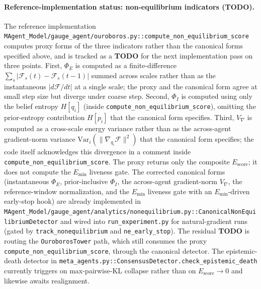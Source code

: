 \documentclass[11pt]{article}
\begin{document}
\paragraph{Reference-implementation status: non-equilibrium indicators (\textbf{TODO}).}
The reference implementation \texttt{MAgent\_Model/gauge\_agent/ouroboros.py::compute\_non\_equilibrium\_score} computes proxy forms of the three indicators rather than the canonical forms specified above, and is tracked as a \textbf{TODO} for the next implementation pass on three points. First, $\Phi_E$ is computed as a finite-difference $\sum_s |\mathcal{F}_s(t) - \mathcal{F}_s(t{-}1)|$ summed across scales rather than as the instantaneous $|d\mathcal{F}/dt|$ at a single scale; the proxy and the canonical form agree at small step size but diverge under coarse step. Second, $\Phi_I$ is computed using only the belief entropy $H[q_i]$ (inside \texttt{compute\_non\_equilibrium\_score}), omitting the prior-entropy contribution $H[p_i]$ that the canonical form specifies. Third, $V_{\nabla}$ is computed as a cross-scale energy variance rather than as the across-agent gradient-norm variance $\mathrm{Var}_{i}(\|\nabla_{q_i}\mathcal{F}\|^2)$ that the canonical form specifies; the code itself acknowledges this divergence in a comment inside \texttt{compute\_non\_equilibrium\_score}. The proxy returns only the composite $E_{\mathrm{score}}$; it does not compute the $E_{\min}$ liveness gate. The corrected canonical forms (instantaneous $\Phi_E$, prior-inclusive $\Phi_I$, the across-agent gradient-norm $V_\nabla$, the reference-window normalization, and the $E_{\min}$ liveness gate with an $E_{\min}$-driven early-stop hook) are already implemented in \texttt{MAgent\_Model/gauge\_agent/analytics/nonequilibrium.py::CanonicalNonEquilibriumDetector} and wired into \texttt{run\_experiment.py} for natural-gradient runs (gated by \texttt{track\_nonequilibrium} and \texttt{ne\_early\_stop}). The residual \textbf{TODO} is routing the \texttt{OuroborosTower} path, which still consumes the proxy \texttt{compute\_non\_equilibrium\_score}, through the canonical detector. The epistemic-death detector in \texttt{meta\_agents.py::ConsensusDetector.check\_epistemic\_death} currently triggers on max-pairwise-KL collapse rather than on $E_{\mathrm{score}} \to 0$ and likewise awaits realignment.
\end{document}
